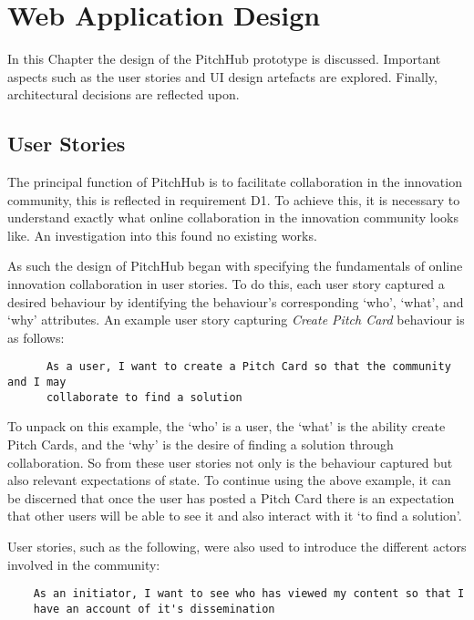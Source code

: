 
\chapter{Web Application Design}\label{C:design_web}

In this Chapter the design of the PitchHub prototype is discussed. Important aspects such as the user stories and UI design artefacts are explored. Finally, architectural decisions are reflected upon.

\section{User Stories}

The principal function of PitchHub is to facilitate collaboration in the innovation community, this is reflected in requirement D1. To achieve this, it is necessary to understand exactly what online collaboration in the innovation community looks like. An investigation into this found no existing works. 

As such the design of PitchHub began with specifying the fundamentals of online innovation collaboration in user stories. To do this, each user story captured a desired behaviour by identifying the behaviour's corresponding `who', `what', and `why' attributes. An example user story capturing \textit{Create Pitch Card} behaviour is as follows:

\begin{verbatim}
	  As a user, I want to create a Pitch Card so that the community and I may 
	  collaborate to find a solution	
\end{verbatim}

To unpack on this example, the `who' is a user, the `what' is the ability create Pitch Cards, and the `why' is the desire of finding a solution through collaboration.
So from these user stories not only is the behaviour captured but also relevant expectations of state. To continue using the above example, it can be discerned that once the user has posted a Pitch Card there is an expectation that other users will be able to see it and also interact with it `to find a solution'. 

User stories, such as the following, were also used to introduce the different actors involved in the community:

\begin{verbatim}
    As an initiator, I want to see who has viewed my content so that I 
    have an account of it's dissemination
\end{verbatim}

